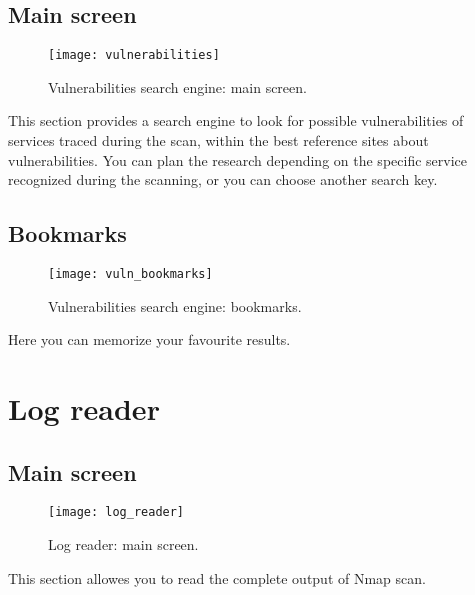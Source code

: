 \section{Main screen}
\label{sec:VulnerabilityMain}

\begin{figure}[h]
  \centering
  \texttt{[image: vulnerabilities]}
  \caption{Vulnerabilities search engine: main screen.}
  \label{fig:VulnerabilityMain}
\end{figure}
This section provides a search engine to look for possible vulnerabilities of 
services traced during the scan, within the best reference sites about 
vulnerabilities. You can plan the research depending on the specific service 
recognized during the scanning, or you can choose another search key.


\section{Bookmarks}
\label{sec:VulnerabilityBookmarks}

\begin{figure}[h]
  \centering
  \texttt{[image: vuln\_bookmarks]}
  \caption{Vulnerabilities search engine: bookmarks.}
  \label{fig:VulnerabilityBookmarks}
\end{figure}
Here you can memorize your favourite results.


\chapter{Log reader}
\label{ch:LogReader}

\section{Main screen}
\label{sec:LogReaderMainScreen}

\begin{figure}[h]
  \centering
  \texttt{[image: log\_reader]}
  \caption{Log reader: main screen.}
  \label{fig:LodReader}
\end{figure}
This section allowes you to read the complete output of Nmap scan.


